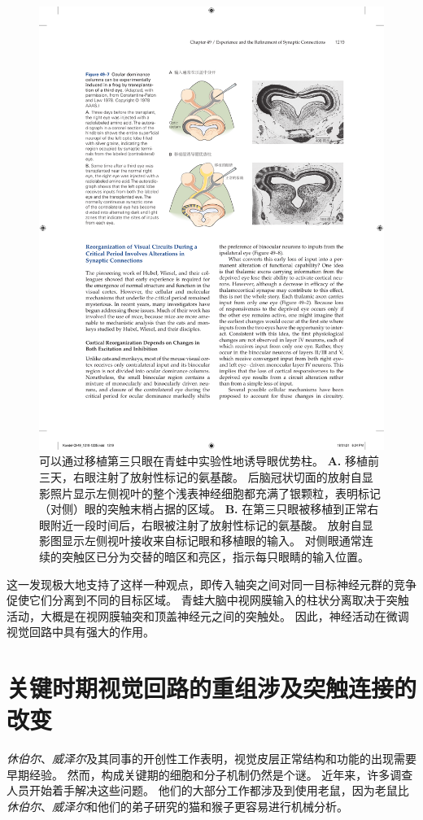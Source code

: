 \begin{figure}[htbp]
	\centering
	\includegraphics[width=0.7\linewidth]{chap49/fig_49_7}
	\caption{可以通过移植第三只眼在青蛙中实验性地诱导眼优势柱\cite{constantine1978eye}。
		\textbf{A.} 移植前三天，右眼注射了放射性标记的氨基酸。
		后脑冠状切面的放射自显影照片显示左侧视叶的整个浅表神经细胞都充满了银颗粒，表明标记（对侧）眼的突触末梢占据的区域。
		\textbf{B.} 在第三只眼被移植到正常右眼附近一段时间后，右眼被注射了放射性标记的氨基酸。
		放射自显影图显示左侧视叶接收来自标记眼和移植眼的输入。
		对侧眼通常连续的突触区已分为交替的暗区和亮区，指示每只眼睛的输入位置。}
	\label{fig:49_7}
\end{figure}


这一发现极大地支持了这样一种观点，即传入轴突之间对同一目标神经元群的竞争促使它们分离到不同的目标区域。
青蛙大脑中视网膜输入的柱状分离取决于突触活动，大概是在视网膜轴突和顶盖神经元之间的突触处。
因此，神经活动在微调视觉回路中具有强大的作用。



\section{关键时期视觉回路的重组涉及突触连接的改变}

\textit{休伯尔}、\textit{威泽尔}及其同事的开创性工作表明，视觉皮层正常结构和功能的出现需要早期经验。
然而，构成关键期的细胞和分子机制仍然是个谜。
近年来，许多调查人员开始着手解决这些问题。
他们的大部分工作都涉及到使用老鼠，因为老鼠比\textit{休伯尔}、\textit{威泽尔}和他们的弟子研究的猫和猴子更容易进行机械分析。


